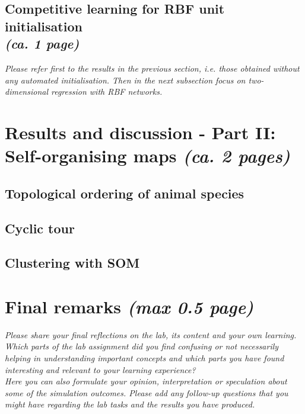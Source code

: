 \documentclass[a4paper]{article}
\begin{document}
\subsection{Competitive learning for RBF unit initialisation\\ \normalsize{\textit{(ca. 1 page)}}}
\textit{Please refer first to the results in the previous section, i.e. those obtained without any automated initialisation. Then in the next subsection focus on two-dimensional regression with RBF networks.}


\section{Results and discussion - Part II: Self-organising maps \normalsize{\textit{(ca. 2 pages)}}}

\subsection{Topological ordering of animal species}

\subsection{Cyclic tour}

\subsection{Clustering with SOM}

\section{Final remarks \normalsize{\textit{(max 0.5 page)}}}
\textit{Please share your final reflections on the lab, its content and your own learning. Which parts of the lab assignment did you find confusing or not necessarily helping in understanding important concepts and which parts you have found interesting and relevant to your learning experience? \\
Here you can also formulate your opinion, interpretation or speculation about some of the simulation outcomes. Please add any follow-up questions that you might have regarding the lab tasks and the results you have produced.}
\end{document}
